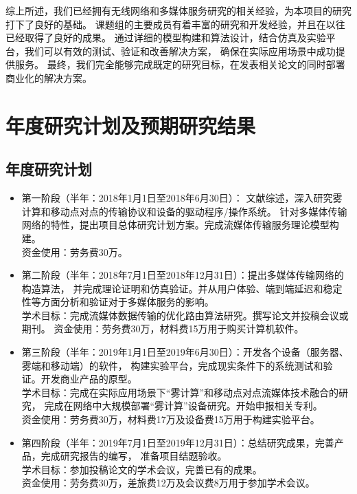 综上所述，我们已经拥有无线网络和多媒体服务研究的相关经验，为本项目的研究打下了良好的基础。
课题组的主要成员有着丰富的研究和开发经验，并且在以往已经取得了良好的成果。
通过详细的模型构建和算法设计，结合仿真及实验平台，我们可以有效的测试、验证和改善解决方案，
确保在实际应用场景中成功提供服务。
最终，我们完全能够完成既定的研究目标，在发表相关论文的同时部署商业化的解决方案。

\section{年度研究计划及预期研究结果}

\subsection{年度研究计划}
\begin{itemize}
\item 第一阶段（半年：2018年1月1日至2018年6月30日）：
文献综述，深入研究雾计算和移动点对点的传输协议和设备的驱动程序/操作系统。
针对多媒体传输网络的特性，提出项目总体研究计划方案。完成流媒体传输服务理论模型构建。\\
资金使用：劳务费30万。

\item 第二阶段（半年：2018年7月1日至2018年12月31日）：提出多媒体传输网络的构造算法，
并完成理论证明和仿真验证。并从用户体验、端到端延迟和稳定性等方面分析和验证对于多媒体服务的影响。\\
学术目标：完成流媒体数据传输的优化路由算法研究。撰写论文并投稿会议或期刊。
资金使用：劳务费30万，材料费15万用于购买计算机软件。

\item 第三阶段（半年：2019年1月1日至2019年6月30日）：开发各个设备（服务器、雾端和移动端）的软件，
构建实验平台，完成现实条件下的系统测试和验证。开发商业产品的原型。 \\
学术目标：完成在实际应用场景下“雾计算”和移动点对点流媒体技术融合的研究，
完成在网络中大规模部署“雾计算”设备研究。开始申报相关专利。\\
资金使用：劳务费30万，材料费17万及设备费15万用于构建实验平台。

\item 第四阶段（半年：2019年7月1日至2019年12月31日）：总结研究成果，完善产品，完成研究报告的编写，
准备项目结题验收。\\
学术目标：参加投稿论文的学术会议，完善已有的成果。\\
资金使用：劳务费30万，差旅费12万及会议费8万用于参加学术会议。
\end{itemize}

